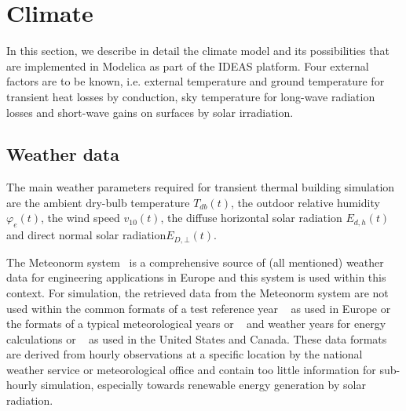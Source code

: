 
\chapter{Climate}





In this section, we describe in detail the climate model and its possibilities that are implemented in Modelica as part of the IDEAS platform. Four external factors are to be known, i.e. external temperature and ground temperature for transient heat losses by conduction, sky temperature for long-wave radiation losses and short-wave gains on surfaces by solar irradiation.

\section{Weather data}
\label{chap:climwea}

The main weather parameters required for transient thermal building simulation are the ambient dry-bulb temperature $T_{db}(t)$, the outdoor relative humidity $\varphi_{e}(t)$, the wind speed $v_{10}(t)$, the diffuse horizontal solar radiation $E_{d,h}(t)$ and direct normal solar radiation$E_{D,\bot}(t)$. 

The Meteonorm system~\cite{Meteotest2008} is a comprehensive source of (all mentioned) weather data for engineering applications in Europe and this system is used within this context. For simulation, the retrieved data from the Meteonorm system are not used within the common formats of a test reference year ~\cite{NCDC1981,EC1985} as used in Europe or the formats of a typical meteorological years  or ~\cite{NCDC1976b,NREC1995} and weather years for energy calculations  or ~\cite{ASHRAE1985} as used in the United States and Canada. These data formats are derived from hourly observations at a specific location by the national weather service or meteorological office and contain too little information for sub-hourly simulation, especially towards renewable energy generation by solar radiation.

